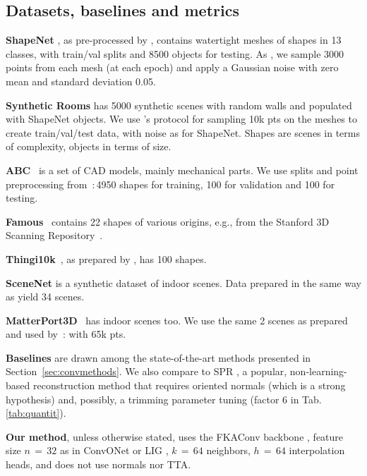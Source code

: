 \documentclass[10pt,twocolumn,letterpaper]{article}
\begin{document}
\subsection{Datasets, baselines and metrics}

\textbf{ShapeNet} \cite{Chang2015ARXIV}, as pre-processed by \cite{Choy2016ECCV}, contains watertight meshes of shapes in 13 classes, with train/val splits and 8500 objects for testing. As \cite{Peng2020ECCV}, we sample 3000 points from each mesh (at each epoch) and apply a Gaussian noise with zero mean and standard deviation 0.05.

\textbf{Synthetic Rooms} \cite{Peng2020ECCV} has 5000 synthetic scenes with random walls and populated with ShapeNet objects. We use \cite{Peng2020ECCV}'s protocol for sampling 10k pts on the meshes to create train/val/test data, with noise as for ShapeNet. Shapes are scenes in terms of complexity, objects in terms of size.

\textbf{ABC}~\cite{Koch_2019_CVPR} is a set of CAD models, mainly mechanical parts. We use splits and point preprocessing from~\cite{Erler2020Points2Surf}:\,4950 shapes for training, 100 for validation and 100 for testing.

\textbf{Famous}~\cite{Erler2020Points2Surf} contains 22 shapes of various origins, e.g., from the Stanford 3D Scanning Repository~\cite{krishnamurthy1996fitting}.

\textbf{Thingi10k}~\cite{zhou2016thingi10k}, as prepared by \cite{Erler2020Points2Surf}, has 100 shapes.

\textbf{SceneNet}  \cite{Handa2016Understanding,handa2016scenenet}
is a synthetic dataset of indoor scenes. Data prepared in the same way as \cite{huang2018robust} yield 34 scenes.

\textbf{MatterPort3D}~\cite{chang2017matterport3d} has indoor scenes too. We use the same 2 scenes as prepared and used by~\cite{tang2021sign}: with 65k pts.

\textbf{Baselines} are drawn among the state-of-the-art methods presented in Section~\ref{sec:convmethods}. We also compare to SPR \cite{Kazhdan2013SIGGRAPH}, a popular, non-learning-based reconstruction method that requires oriented normals (which is a strong hypothesis) and, possibly, a trimming parameter tuning (factor 6 in Tab.\,\ref{tab:quantit}).

\textbf{Our method}, unless otherwise stated, uses the FKAConv backbone \cite{Boulch2020ACCV}, feature size $n\,{=}\,32$ as in ConvONet \cite{Peng2020ECCV} or LIG \cite{Jiang2020CVPR}, $k\,{=}\,64$ neighbors, $h\,{=}\,64$ interpolation heads, and does not use normals nor TTA.
\end{document}
